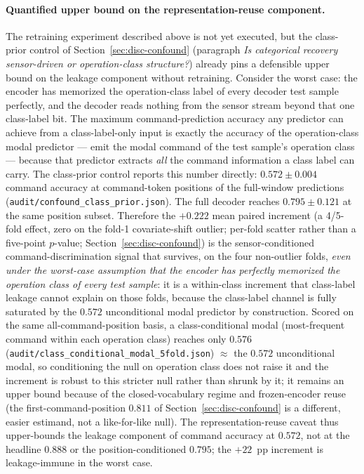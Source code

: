 \documentclass[11pt,a4paper]{article}
\begin{document}
\paragraph{Quantified upper bound on the representation-reuse component.} The retraining experiment described above is not yet executed, but the class-prior control of Section~\ref{sec:disc-confound} (paragraph \emph{Is categorical recovery sensor-driven or operation-class structure?}) already pins a defensible upper bound on the leakage component without retraining. Consider the worst case: the encoder has memorized the operation-class label of every decoder test sample perfectly, and the decoder reads nothing from the sensor stream beyond that one class-label bit. The maximum command-prediction accuracy any predictor can achieve from a class-label-only input is exactly the accuracy of the operation-class modal predictor --- emit the modal command of the test sample's operation class --- because that predictor extracts \emph{all} the command information a class label can carry. The class-prior control reports this number directly: $0.572 \pm 0.004$ command accuracy at command-token positions of the full-window predictions (\texttt{audit/confound\_class\_prior.json}). The full decoder reaches $0.795 \pm 0.121$ at the same position subset. Therefore the $+0.222$ mean paired increment (a 4/5-fold effect, zero on the fold-1 covariate-shift outlier; per-fold scatter rather than a five-point $p$-value; Section~\ref{sec:disc-confound}) is the sensor-conditioned command-discrimination signal that survives, on the four non-outlier folds, \emph{even under the worst-case assumption that the encoder has perfectly memorized the operation class of every test sample}: it is a within-class increment that class-label leakage cannot explain on those folds, because the class-label channel is fully saturated by the $0.572$ unconditional modal predictor by construction. Scored on the same all-command-position basis, a class-conditional modal (most-frequent command within each operation class) reaches only $0.576$ (\texttt{audit/class\_conditional\_modal\_5fold.json}) $\approx$ the $0.572$ unconditional modal, so conditioning the null on operation class does not raise it and the increment is robust to this stricter null rather than shrunk by it; it remains an upper bound because of the closed-vocabulary regime and frozen-encoder reuse (the first-command-position $0.811$ of Section~\ref{sec:disc-confound} is a different, easier estimand, not a like-for-like null). The representation-reuse caveat thus upper-bounds the leakage component of command accuracy at $0.572$, not at the headline $0.888$ or the position-conditioned $0.795$; the $+22$~pp increment is leakage-immune in the worst case.
\end{document}
